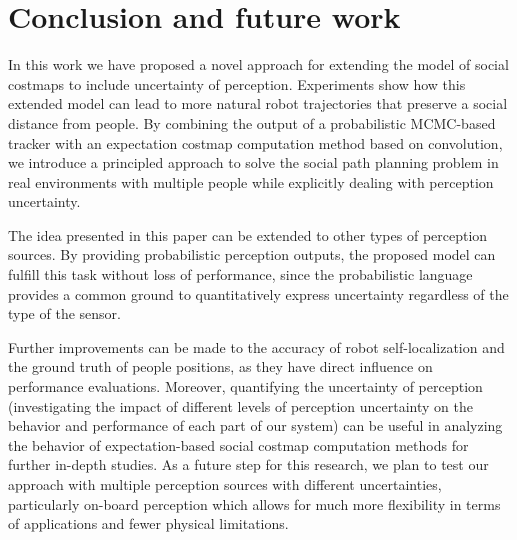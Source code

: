 \section{Conclusion and future work}
\label{sec:conclusion}

In this work we have proposed a novel approach for extending the model of social costmaps to include uncertainty of perception. Experiments show how this extended model can lead to more natural robot trajectories that preserve a social distance from people. By combining the output of a probabilistic MCMC-based tracker with an expectation costmap computation method based on convolution, we introduce a principled approach to solve the social path planning problem in real environments with multiple people while explicitly dealing with perception uncertainty. 



The idea presented in this paper can be extended to other types of perception sources. By providing probabilistic perception outputs, the proposed model can fulfill this task without loss of performance, since the probabilistic language provides a common ground to quantitatively express uncertainty regardless of the type of the sensor. 


Further improvements can be made to the accuracy of robot self-localization and the ground truth of people positions, as they have direct influence on performance evaluations. Moreover, quantifying the uncertainty of perception (investigating the impact of different levels of perception uncertainty on the behavior and performance of each part of our system) can be useful in analyzing the behavior of expectation-based social costmap computation methods for further in-depth studies. As a future step for this research, we plan to test our approach with multiple perception sources with different uncertainties, particularly on-board perception which allows for much more flexibility in terms of applications and fewer physical limitations.%









